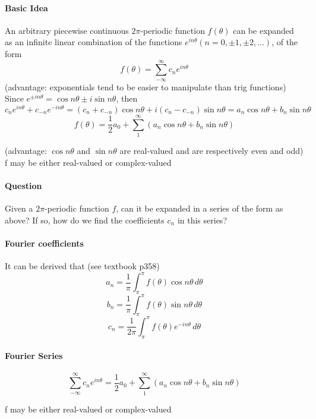 \documentclass[11pt]{article}
\begin{document}
\paragraph{Basic Idea} An arbitrary piecewise continuous $2\pi$-periodic function $f(\theta)$ can be expanded as an infinite linear combination of the functions $e^{in\theta}(n = 0,\pm 1, \pm 2,\hdots)$, of the form
$$f(\theta) = \sum_{-\infty}^{\infty}c_ne^{in\theta}$$
(advantage: exponentials tend to be easier to manipulate than trig functions)\\
Since $e^{\pm in\theta} = \cos n\theta \pm i \sin n \theta$, then $c_ne^{in\theta} + c_{-n}e^{-in\theta} = (c_n + c_{-n})\cos n \theta + i(c_n - c_{-n}) \sin n\theta = a_n\cos n \theta + b_n \sin n\theta$
$$f(\theta) = \frac{1}{2}a_0 + \sum_1^\infty(a_n\cos n\theta+b_n \sin n\theta)$$

\noindent (advantage: $\cos n\theta$ and $\sin n\theta$ are real-valued and are respectively even and odd)\\
f may be either real-valued or complex-valued\\
\paragraph{Question}
Given a $2\pi$-periodic function $f$, can it be expanded in a series of the form as above? If so, how do we find the coefficients $c_n$ in this series?
\paragraph{Fourier coefficients}
It can be derived that (see textbook p358)
$$a_n = \frac{1}{\pi}\int_\pi^\pi f(\theta)\cos n\theta \, d\theta$$
$$b_n = \frac{1}{\pi}\int_\pi^\pi f(\theta)\sin n\theta \, d\theta$$
$$c_n = \frac{1}{2\pi}\int_\pi^\pi f(\theta)e^{-in\theta} \, d\theta$$
\paragraph{Fourier Series}
$$\sum_{-\infty}^{\infty} c_n e^{in\theta} = \frac{1}{2}a_0 + \sum_1^\infty(a_n\cos n\theta + b_n \sin n\theta)$$

f may be either real-valued or complex-valued
\end{document}
